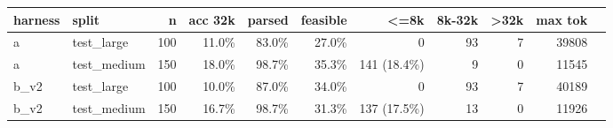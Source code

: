 \begin{tabular}{llrrrrrrrrr}
\toprule
harness & split & n & acc 32k & parsed & feasible & <=8k & 8k-32k & >32k & max tok \\
\midrule
a & test\_large & 100 & 11.0\% & 83.0\% & 27.0\% & 0 & 93 & 7 & 39808 \\
a & test\_medium & 150 & 18.0\% & 98.7\% & 35.3\% & 141 (18.4\%) & 9 & 0 & 11545 \\
b\_v2 & test\_large & 100 & 10.0\% & 87.0\% & 34.0\% & 0 & 93 & 7 & 40189 \\
b\_v2 & test\_medium & 150 & 16.7\% & 98.7\% & 31.3\% & 137 (17.5\%) & 13 & 0 & 11926 \\
\bottomrule
\end{tabular}
